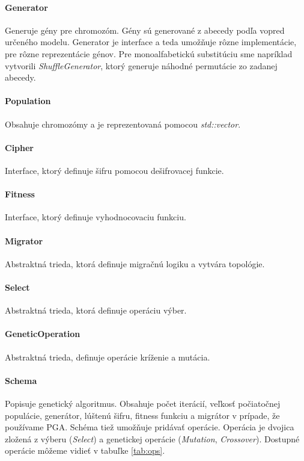 \paragraph{Generator} Generuje gény pre chromozóm. Gény sú generované z abecedy podľa vopred určeného modelu.
Generator je interface a teda umožňuje rôzne implementácie, pre rôzne reprezentácie génov.
Pre monoalfabetickú substitúciu sme napríklad vytvorili \textit{ShuffleGenerator}, ktorý generuje náhodné permutácie zo zadanej abecedy.
\paragraph{Population} Obsahuje chromozómy a je reprezentovaná pomocou \textit{std::vector}.
\paragraph{Cipher} Interface, ktorý definuje šifru pomocou dešifrovacej funkcie.
\paragraph{Fitness} Interface, ktorý definuje vyhodnocovaciu funkciu.
\paragraph{Migrator} Abstraktná trieda, ktorá definuje migračnú logiku a vytvára topológie.
\paragraph{Select} Abstraktná trieda, ktorá definuje operáciu výber.
\paragraph{GeneticOperation} Abstraktná trieda, definuje operácie kríženie a mutácia.
\paragraph{Schema} Popisuje genetický algoritmus.
Obsahuje počet iterácií, veľkosť počiatočnej populácie, generátor, lúštenú šifru, fitness funkciu a migrátor v prípade, že používame PGA.
Schéma tiež umožňuje pridávať operácie.
Operácia je dvojica zložená z výberu (\textit{Select}) a genetickej operácie (\textit{Mutation}, \textit{Crossover}).
Dostupné operácie môžeme vidieť v tabuľke \ref{tab:ops}.

